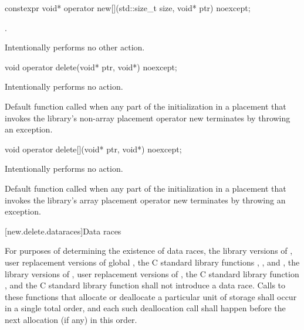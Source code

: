 %
\begin{itemdecl}
constexpr void* operator new[](std::size_t size, void* ptr) noexcept;
\end{itemdecl}

\begin{itemdescr}
\pnum
\returns
{}.

\pnum
\remarks
Intentionally performs no other action.
\end{itemdescr}

%
\begin{itemdecl}
void operator delete(void* ptr, void*) noexcept;
\end{itemdecl}

\begin{itemdescr}
\pnum
\effects
Intentionally performs no action.

\pnum
\remarks
Default function called when any part of the initialization in a
placement  that invokes the library's
non-array placement operator new
terminates by throwing an exception.
\end{itemdescr}

%
\begin{itemdecl}
void operator delete[](void* ptr, void*) noexcept;
\end{itemdecl}

\begin{itemdescr}
\pnum
\effects
Intentionally performs no action.

\pnum
\remarks
Default function called when any part of the initialization in a
placement  that invokes the library's
array placement operator new
terminates by throwing an exception.
\end{itemdescr}

[new.delete.dataraces]{Data races}

\pnum
For purposes of determining the existence of data races, the library versions
of , user replacement versions of global ,
the C standard library functions
, , and ,
the library
versions of , user replacement
versions of , the C standard library function
, and the C standard library function  shall not
introduce a data race.
Calls to these functions that allocate or deallocate a particular unit
of storage shall occur in a single total order, and each such deallocation call
shall happen before the next allocation (if any) in
this order.

